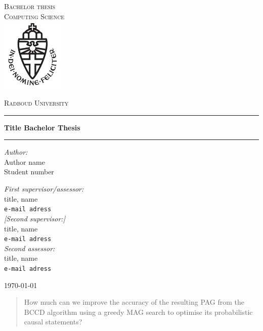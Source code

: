 \documentclass[11pt,a4paper]{report}
\begin{document}
\begin{titlepage}
\begin{center}
\textsc{\LARGE Bachelor thesis\\Computing Science}\\[1.5cm]
\includegraphics[height=100pt]{logo}

\vspace{0.4cm}
\textsc{\Large Radboud University}\\[1cm]
\hrule
\vspace{0.4cm}
\textbf{\huge Title Bachelor Thesis}\\[0.4cm]
\hrule
\vspace{2cm}
\begin{minipage}[t]{0.45\textwidth}
\begin{flushleft} \large
\textit{Author:}\\
Author name\\
Student number
\end{flushleft}
\end{minipage}
\begin{minipage}[t]{0.45\textwidth}
\begin{flushright} \large
\textit{First supervisor/assessor:}\\
title, name\\
\texttt{e-mail adress}\\[1.3cm]
\textit{[Second supervisor:]}\\
title, name\\
\texttt{e-mail adress}\\[1.3cm]
\textit{Second assessor:}\\
title, name\\
\texttt{e-mail adress}
\end{flushright}
\end{minipage}
\vfill
{\large \today}
\end{center}
\end{titlepage}

\begin{abstract}
How much can we improve the accuracy of the resulting PAG from the BCCD
algorithm using a greedy MAG search to optimise its probabilistic causal
statements?
\end{abstract}
\end{document}
